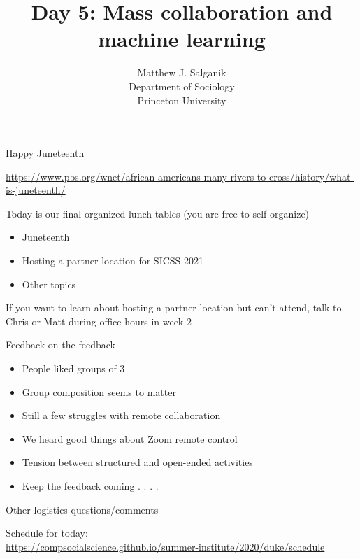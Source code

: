 \documentclass[aspectratio=169]{beamer}
\title{Day 5: Mass collaboration and machine learning}
\author{Matthew J. Salganik\\Department of Sociology\\Princeton University}
\date[]{
\begin{flushright}
\texttt{[image: figures/cc-by.png]}
\end{flushright}
}
\begin{document}
\frame{\titlepage}
\begin{frame}

Happy Juneteenth

\vfill
\url{https://www.pbs.org/wnet/african-americans-many-rivers-to-cross/history/what-is-juneteenth/}

\end{frame}
\begin{frame}

Today is our final organized lunch tables (you are free to self-organize) \pause
\begin{itemize}
\item Juneteenth \pause
\item Hosting a partner location for SICSS 2021\pause
\item Other topics 
\end{itemize}

\vfill
If you want to learn about hosting a partner location but can't attend, talk to Chris or Matt during office hours in week 2

\end{frame}
\begin{frame}

Feedback on the feedback \pause
\begin{itemize}
\item People liked groups of 3 \pause
\item Group composition seems to matter \pause
\item Still a few struggles with remote collaboration \pause
\item We heard good things about Zoom remote control \pause
\item Tension between structured and open-ended activities \pause
\item Keep the feedback coming . . . .
\end{itemize}

\end{frame}
\begin{frame}

Other logistics questions/comments

\end{frame}
\begin{frame}

Schedule for today:\\
\url{https://compsocialscience.github.io/summer-institute/2020/duke/schedule}

\end{frame}
\end{document}
